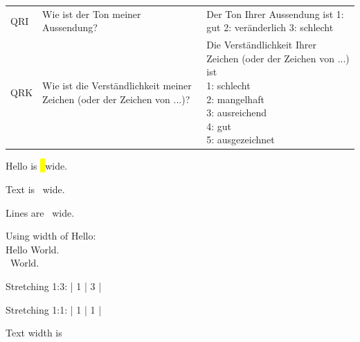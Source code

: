 \documentclass{article}
\begin{document}
\newcommand{\wrap}[1]{\begin{minipage}[t]{4cm}#1\end{minipage}}
\begin{xtabular}{lll}
QRI & Wie ist der Ton meiner Aussendung? & Der Ton Ihrer Aussendung ist 1: gut 2: veränderlich 3: schlecht \\
QRK & Wie ist die Verständlichkeit meiner Zeichen (oder der Zeichen von ...)? & \wrap{Die Verständlichkeit Ihrer Zeichen (oder der Zeichen von ...) ist\\ 1: schlecht\\ 2: mangelhaft\\ 3: ausreichend\\ 4: gut\\ 5: ausgezeichnet} \\
\end{xtabular}


\newlength{\hl}
\settowidth{\hl}{Hello}
Hello is \the\hl\ wide.

Text is \the\textwidth\ wide.

\setlength{\parskip}{\parskip+6pt}

Lines are \the\linewidth\ wide.

Using width of Hello:\\
Hello World.\\
\hspace*{\hl}\ World.

Stretching 1:3: |  1  |  3  |

Stretching 1:1: | \hfill 1 \hfill | \hfill 1 \hfill |

\newsavebox{\myBox}

\newlength{\imgW}
\settowidth{\imgW}{\usebox{\myBox}}

Text width is \the\imgW

\end{document}
